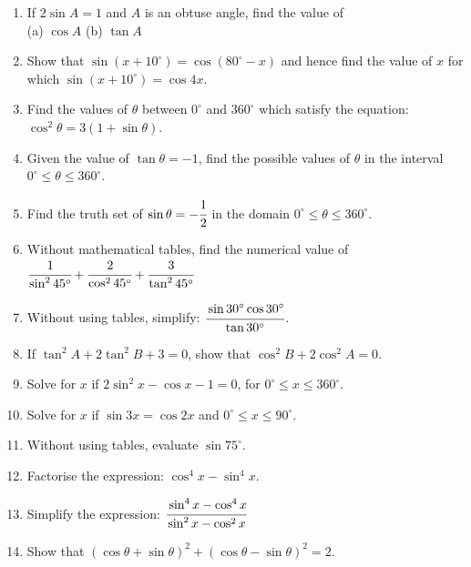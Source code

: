 \begin{enumerate}
	\item If $2\sin A = 1$ and $A$ is an obtuse angle, find the value of\\
	(a) $\cos A$ \quad (b) $\tan A$
	



	\item Show that $\sin(x + 10^\circ) = \cos(80^\circ - x)$ and hence find the value of $x$ for which $\sin(x + 10^\circ) = \cos 4x$.

	\item Find the values of $\theta$ between $0^\circ$ and $360^\circ$ which satisfy the equation:\\
	$\cos^2 \theta = 3(1 + \sin \theta)$.
	
	\item Given the value of $\tan \theta = -1$, find the possible values of $\theta$ in the interval $0^\circ \leq \theta \leq 360^\circ$.
	
	\item Find the truth set of $\sin \theta = -\cfrac{1}{2}$ in the domain $0^\circ \leq \theta \leq 360^\circ$.
	
		\item Without mathematical tables, find the numerical value of\\
	$\cfrac{1}{\sin^2 45^\circ} + \cfrac{2}{\cos^2 45^\circ} + \cfrac{3}{\tan^2 45^\circ}$
	
	\item Without using tables, simplify: $\cfrac{\sin 30^\circ \cos 30^\circ}{\tan 30^\circ}$.
	
	\item If $\tan^2 A + 2\tan^2 B + 3 = 0$, show that $\cos^2 B + 2\cos^2 A = 0$.
	
	\item Solve for $x$ if $2\sin^2 x - \cos x - 1 = 0$, for $0^\circ \leq x \leq 360^\circ$.
	
	\item Solve for $x$ if $\sin 3x = \cos 2x$ and $0^\circ \leq x \leq 90^\circ$.
	
	\item Without using tables, evaluate $\sin 75^\circ$.
	
	\item Factorise the expression: $\cos^4 x - \sin^4 x$.
	
	\item Simplify the expression: $\cfrac{\sin^4 x - \cos^4 x}{\sin^2 x - \cos^2 x}$
	
	\item Show that $(\cos \theta + \sin \theta)^2 + (\cos \theta - \sin \theta)^2 = 2$.
	

\end{enumerate}
